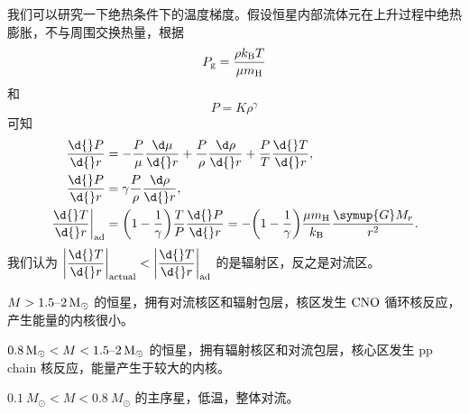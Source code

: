 \documentclass[../天体物理基础.tex]{subfiles}
\begin{document}
我们可以研究一下绝热条件下的温度梯度。假设恒星内部流体元在上升过程中绝热膨胀，不与周围交换热量，根据
\begin{equation}
P_{\mathrm{g}}=\frac{\rho{}k_{\mathrm{B}}T}{\mu m_{\ce{H}}}
\end{equation}
和
\begin{equation}
P=K\rho^{\gamma}
\end{equation}
可知
\begin{align}
\frac{\d{}P}{\d{}r}&=-\frac{P}{\mu}\frac{\d\mu}{\d{}r}+\frac{P}{\rho}\frac{\d\rho}{\d{}r}+\frac{P}{T}\frac{\d{}T}{\d{}r},\notag\\
\frac{\d{}P}{\d{}r}&=\gamma\frac{P}{\rho}\frac{\d\rho}{\d{}r},\notag\\
\mleft.\frac{\d{}T}{\d{}r}\mright\vert_{\mathrm{ad}}&=\mleft(1-\frac{1}{\gamma}\mright)\frac{T}{P}\frac{\d{}P}{\d{}r}=-\mleft(1-\frac{1}{\gamma}\mright)\frac{\mu m_{\ce{H}}}{k_{\mathrm{B}}}\frac{\symup{G}M_{r}}{r^{2}}.
\end{align}
我们认为 $\mleft\vert\dfrac{\d{}T}{\d{}r}\mright\vert_{\mathrm{actual}}<\mleft\vert\dfrac{\d{}T}{\d{}r}\mright\vert_{\mathrm{ad}}$ 的是辐射区，反之是对流区。

$M>1.5\text{\textendash}\qty{2}{M_{\odot}}$ 的恒星，拥有对流核区和辐射包层，核区发生 $\ce{CNO}$ 循环核反应，产生能量的内核很小。

$\qty{0.8}{M_{\odot}}<M<1.5\text{\textendash}\qty{2}{M_{\odot}}$ 的恒星，拥有辐射核区和对流包层，核心区发生 pp chain 核反应，能量产生于较大的内核。

$\qty{0.1}{M_{\odot}}<M<\qty{0.8}{M_{\odot}}$ 的主序星，低温，整体对流。
\end{document}
